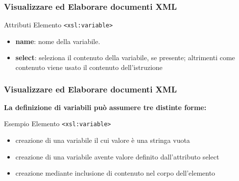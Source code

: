 \begin{frame}
    \frametitle{Visualizzare ed Elaborare documenti XML}
    \addtocounter{nframe}{1}
    

     \begin{block}{Attributi Elemento \texttt{<xsl:variable>}}
         \begin{itemize}
             \item \textbf{name}: nome della variabile.
             \item \textbf{select}: seleziona il contenuto della variabile, se presente; altrimenti come contenuto viene usato il contenuto dell’istruzione 
        \end{itemize}
     \end{block}
    
\end{frame}

\begin{frame}
    \frametitle{Visualizzare ed Elaborare documenti XML}
    \addtocounter{nframe}{1}
    
    \textbf{La definizione di variabili può assumere tre distinte forme:}

     \begin{block}{Esempio Elemento \texttt{<xsl:variable>}}
        \begin{itemize}
            \item creazione di una variabile il cui valore è una stringa vuota
            \item creazione di una variabile avente valore definito dall'attributo select
            \item creazione mediante inclusione di contenuto nel corpo dell'elemento
        \end{itemize}
     \end{block}
\end{frame}

